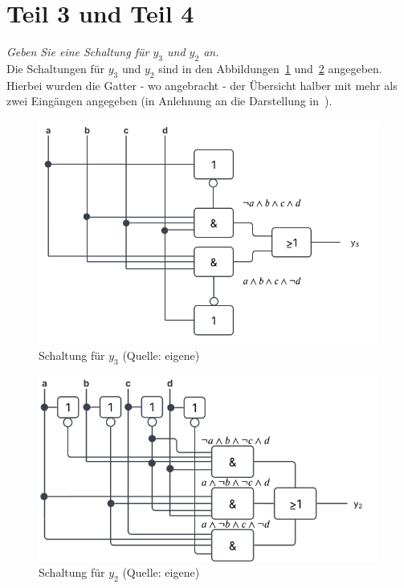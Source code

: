 \section{Teil 3 und Teil 4}

\textit{Geben Sie eine Schaltung für $y_3$ und $y_2$ an.}\\


\noindent
Die Schaltungen für $y_3$ und $y_2$ sind in den Abbildungen~\ref{fig:schaltplan_y3} und~\ref{fig:schaltplan_y2} angegeben.
Hierbei wurden die Gatter - wo angebracht - der Übersicht halber mit mehr als zwei Eingängen angegeben (in Anlehnung an die Darstellung in~\cite[\textbf{Abbildung 24}, 57]{BL22}).

\begin{figure}
    \centering
    \includegraphics[scale=0.5]{aufgabe 2/img/schaltplan_y3}
    \caption{Schaltung für $y_3$ (Quelle: eigene)}
    \label{fig:schaltplan_y3}
\end{figure}

\vspace{10mm}

\begin{figure}
    \centering
    \includegraphics[scale=0.52]{aufgabe 2/img/schaltplan_y2}
    \caption{Schaltung für $y_2$ (Quelle: eigene)}
    \label{fig:schaltplan_y2}
\end{figure}

